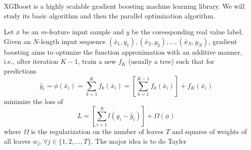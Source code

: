


XGBoost is a highly scalable gradient boosting machine learning library. We will
study its basic algorithm and then the parallel optimization algorithm.


Let $\bar{x}$ be an $m$-feature input sample and $y$ be the coressponding real value label.
Given an $N$-length input sequence $(\bar{x}_1, y_1), (\bar{x}_2, y_2), \ldots, (\bar{x}_N,y_N)$,
gradient boosting aims to optimize the function
approximation with an additive manner, i.e., after iteration $ K-1 $, train a
new $ f_{K }$ (usually a tree) such that for predictions
$$
{\hat{y}}_i = \phi(\bar{x}_i)
= \sum_{k=1}^K f_{k} (\bar{x}_i)
= \left[ \sum_{k=1}^{K-1} f_{k} (\bar{x}_i) \right] + f_K(\bar{x}_i)
$$
minimize the loss of
$$
L = \left[
  \sum_{i=1}^N l (y_i - \hat{y}_i)
    \right]
+ \Omega(\phi)
$$
where $\Omega$ is the regularization on the number of leaves $T$ and squares of
weights of all leaves $w_j, \forall j \in\{1, 2, \ldots, T\}$. The major idea is
to do Tayler

\vfill
\bye
